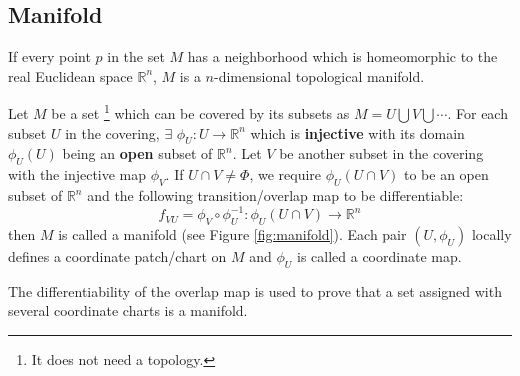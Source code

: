 \documentclass[11pt, a4paper]{book}
\begin{document}

\subsection{Manifold}

\begin{Definition}
  \label{def:topological-manifold}
  If every point $p$ in the set $M$ has a neighborhood which is homeomorphic to the real
  Euclidean space $\mathbb{R}^n$, $M$ is a $n$-dimensional topological manifold.
\end{Definition}


\begin{Definition}[Manifold]
  \label{def:manifold}
  Let $M$ be a set \footnote{It does not need a topology.} which can be covered by its
  subsets as $M=U \bigcup V \bigcup \cdots$. For each subset $U$ in the covering,
  $\exists$ $\phi_U : U \rightarrow \mathbb{R}^n$ which is \textbf{injective} with its
  domain $\phi_U(U)$ being an \textbf{open} subset of $\mathbb{R}^n$. Let $V$ be another
  subset in the covering with the injective map $\phi_V$. If $U \cap V \neq \Phi$, we
  require $\phi_U(U \cap V)$ to be an open subset of $\mathbb{R}^n$ and the following
  transition/overlap map to be differentiable:
  $$
  f_{VU} = \phi_V \circ \phi_U^{-1}: \phi_U(U \cap V) \rightarrow \mathbb{R}^n
  $$
  then $M$ is called a manifold (see Figure \ref{fig:manifold}). Each pair $(U, \phi_U)$
  locally defines a coordinate patch/chart on $M$ and $\phi_U$ is called a coordinate map.
\end{Definition}


\begin{Remark}
  The differentiability of the overlap map is used to prove that a set assigned with
  several coordinate charts is a manifold.
\end{Remark}
\end{document}
